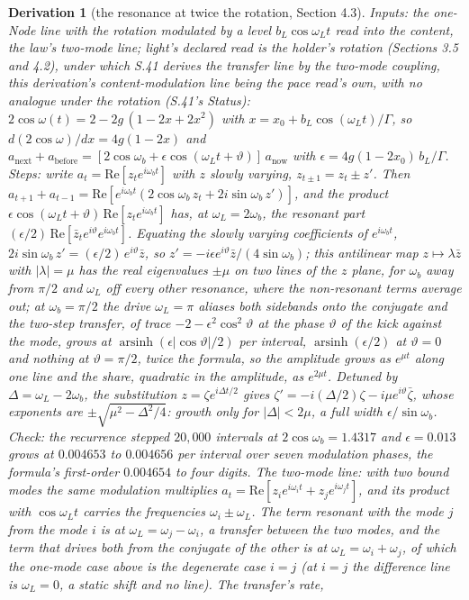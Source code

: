 \documentclass[pdflatex,sn-mathphys-num]{sn-jnl}
\newcommand{\anow}{a_{\mathrm{now}}}
\newcommand{\abefore}{a_{\mathrm{before}}}
\newcommand{\anext}{a_{\mathrm{next}}}
\theoremstyle{thmstyleone}
\newtheorem{derivation}{Derivation}
\begin{document}
\begin{derivation}[the resonance at twice the rotation, Section 4.3]
\emph{Inputs:} the one-Node line with the rotation modulated by a level $b_L\cos\omega_L t$ read into the content, the law's two-mode line; light's declared read is the holder's rotation (Sections 3.5 and 4.2), under which S.41 derives the transfer line by the two-mode coupling, this derivation's content-modulation line being the pace read's own, with no analogue under the rotation (S.41's Status): $2\cos\omega(t) = 2 - 2g\,(1 - 2x + 2x^2)$ with $x = x_0 + b_L\cos(\omega_L t) / \Gamma$, so $d(2\cos\omega) / dx = 4g(1 - 2x)$ and $\anext + \abefore = [2\cos\omega_b + \epsilon\cos(\omega_L t + \vartheta)]\,\anow$ with $\epsilon = 4g(1 - 2x_0)\,b_L / \Gamma$. \emph{Steps:} write $a_t = \mathrm{Re}[z_t e^{i\omega_b t}]$ with $z$ slowly varying, $z_{t \pm 1} = z_t \pm z'$. Then $a_{t+1} + a_{t-1} = \mathrm{Re}[e^{i\omega_b t}(2\cos\omega_b\,z_t + 2i\sin\omega_b\,z')]$, and the product $\epsilon\cos(\omega_L t + \vartheta)\,\mathrm{Re}[z_t e^{i\omega_b t}]$ has, at $\omega_L = 2\omega_b$, the resonant part $(\epsilon / 2)\,\mathrm{Re}[\bar z_t e^{i\vartheta} e^{i\omega_b t}]$. Equating the slowly varying coefficients of $e^{i\omega_b t}$, $2i\sin\omega_b\,z' = (\epsilon / 2)\,e^{i\vartheta}\bar z$, so $z' = -i\epsilon e^{i\vartheta}\bar z / (4\sin\omega_b)$; this antilinear map $z \mapsto \lambda\bar z$ with $|\lambda| = \mu$ has the real eigenvalues $\pm\mu$ on two lines of the $z$ plane, for $\omega_b$ away from $\pi / 2$ and $\omega_L$ off every other resonance, where the non-resonant terms average out; at $\omega_b = \pi / 2$ the drive $\omega_L = \pi$ aliases both sidebands onto the conjugate and the two-step transfer, of trace $-2 - \epsilon^2\cos^2\vartheta$ at the phase $\vartheta$ of the kick against the mode, grows at $\operatorname{arsinh}(\epsilon|\cos\vartheta| / 2)$ per interval, $\operatorname{arsinh}(\epsilon / 2)$ at $\vartheta = 0$ and nothing at $\vartheta = \pi / 2$, twice the formula, so the amplitude grows as $e^{\mu t}$ along one line and the share, quadratic in the amplitude, as $e^{2\mu t}$. Detuned by $\Delta = \omega_L - 2\omega_b$, the substitution $z = \zeta e^{i\Delta t / 2}$ gives $\zeta' = -i(\Delta / 2)\zeta - i\mu e^{i\vartheta}\bar\zeta$, whose exponents are $\pm\sqrt{\mu^2 - \Delta^2 / 4}$: growth only for $|\Delta| < 2\mu$, a full width $\epsilon / \sin\omega_b$. \emph{Check:} the recurrence stepped $20{,}000$ intervals at $2\cos\omega_b = 1.4317$ and $\epsilon = 0.013$ grows at $0.004653$ to $0.004656$ per interval over seven modulation phases, the formula's first-order $0.004654$ to four digits. \emph{The two-mode line:} with two bound modes the same modulation multiplies $a_t = \mathrm{Re}[z_i e^{i\omega_i t} + z_j e^{i\omega_j t}]$, and its product with $\cos\omega_L t$ carries the frequencies $\omega_i \pm \omega_L$. The term resonant with the mode $j$ from the mode $i$ is at $\omega_L = \omega_j - \omega_i$, a transfer between the two modes, and the term that drives both from the conjugate of the other is at $\omega_L = \omega_i + \omega_j$, of which the one-mode case above is the degenerate case $i = j$ (at $i = j$ the difference line is $\omega_L = 0$, a static shift and no line). The transfer's rate, 
\end{derivation}
\end{document}
